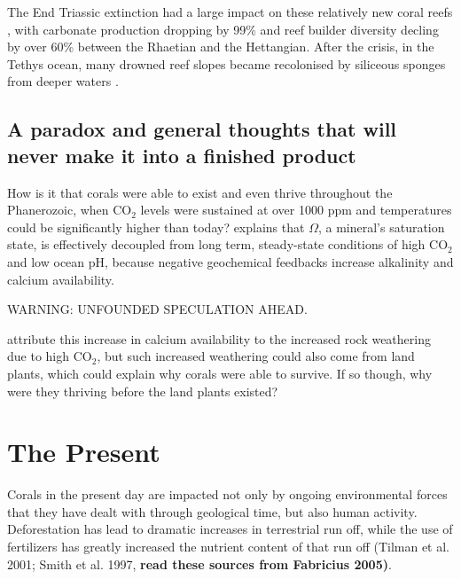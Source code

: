 \documentclass[11pt,a4paper]{article}
\begin{document}
The End Triassic extinction had a large impact on these relatively new coral reefs \citep{Kiessling2009}, with carbonate production dropping by 99\% and reef builder diversity decling by over 60\% between the Rhaetian and the Hettangian.%
After the crisis, in the Tethys ocean, many drowned reef slopes became recolonised by siliceous sponges from deeper waters \citep{Delecat2011}.
 




\subsection{A paradox and general thoughts that will never make it into a finished product}

How is it that corals were able to exist and even thrive throughout the Phanerozoic, when CO$_{2}$ levels were sustained at over 1000 ppm and temperatures could be significantly higher than today?
 \cite{Pandolfi2011} explains that $\Omega$, a mineral's saturation state, is effectively decoupled from long term, steady-state conditions of high CO$_{2}$ and low ocean pH, because negative geochemical feedbacks increase alkalinity and calcium availability.

WARNING: UNFOUNDED SPECULATION AHEAD.

 \cite{Pandolfi2011} attribute this increase in calcium availability to the increased rock weathering due to high CO$_{2}$, but such increased weathering could also come from land plants, which could explain why corals were able to survive. If so though, why were they thriving before the land plants existed?



\section{The Present}

Corals in the present day are impacted not only by ongoing environmental forces that they have dealt with through geological time, but also human activity.
 Deforestation has lead to dramatic increases in terrestrial run off, while the use of fertilizers has greatly increased the nutrient content of that run off (Tilman et al. 2001; Smith et al. 1997, \textbf{read these sources from Fabricius 2005)}. 
\end{document}
